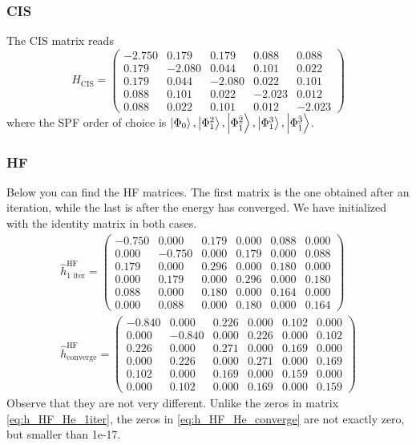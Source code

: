 \subsubsection{CIS}
The CIS matrix reads
\begin{equation}
\hat{H}_{\text{CIS}}=
\begin{pmatrix}
-2.750 & 0.179 & 0.179 & 0.088 & 0.088\\
0.179 & -2.080 & 0.044 & 0.101 & 0.022\\
0.179 & 0.044 & -2.080 & 0.022 & 0.101\\
0.088 & 0.101 & 0.022 & -2.023 & 0.012\\
0.088 & 0.022 & 0.101 & 0.012 & -2.023
\end{pmatrix}
\label{eq:H_He}
\end{equation}
where the SPF order of choice is $\ket{\Phi_0}, \ket{\Phi_1^2}, \ket{\Phi_{\bar{1}}^{\bar{2}}}, \ket{\Phi_1^3}, \ket{\Phi_{\bar{1}}^{\bar{3}}}$.

\subsubsection{HF}
Below you can find the HF matrices. The first matrix is the one obtained after an iteration, while the last is after the energy has converged. We have initialized with the identity matrix in both cases. 
\begin{align}
\hat{h}_{\text{1 iter}}^{\text{HF}}=
\begin{pmatrix}
-0.750 & 0.000 & 0.179 & 0.000 & 0.088 & 0.000\\
0.000 & -0.750 & 0.000 & 0.179 & 0.000 & 0.088\\
0.179 & 0.000 & 0.296 & 0.000 & 0.180 & 0.000\\
0.000 & 0.179 & 0.000 & 0.296 & 0.000 & 0.180\\
0.088 & 0.000 & 0.180 & 0.000 & 0.164 & 0.000\\
0.000 & 0.088 & 0.000 & 0.180 & 0.000 & 0.164
\end{pmatrix}\label{eq:h_HF_He_1iter}\\
\hat{h}_{\text{converge}}^{\text{HF}}=
\begin{pmatrix}
-0.840 & 0.000 & 0.226 & 0.000 & 0.102 & 0.000\\
0.000 & -0.840 & 0.000 & 0.226 & 0.000 & 0.102\\
0.226 & 0.000 & 0.271 & 0.000 & 0.169 & 0.000\\
0.000 & 0.226 & 0.000 & 0.271 & 0.000 & 0.169\\
0.102 & 0.000 & 0.169 & 0.000 & 0.159 & 0.000\\
0.000 & 0.102 & 0.000 & 0.169 & 0.000 & 0.159
\end{pmatrix}
\label{eq:h_HF_He_converge}
\end{align}
Observe that they are not very different. Unlike the zeros in matrix \eqref{eq:h_HF_He_1iter}, the zeros in \eqref{eq:h_HF_He_converge} are not exactly zero, but smaller than 1e-17. 
\newpage
